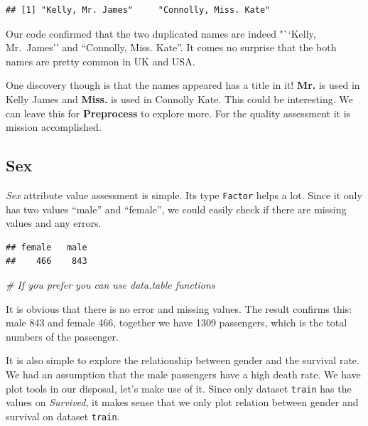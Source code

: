 \documentclass[
]{book}
\newenvironment{Shaded}{\begin{snugshade}}{\end{snugshade}}
\newcommand{\CommentTok}[1]{\textcolor[rgb]{0.56,0.35,0.01}{\textit{#1}}}
\newcommand{\KeywordTok}[1]{\textcolor[rgb]{0.13,0.29,0.53}{\textbf{#1}}}
\newcommand{\NormalTok}[1]{#1}
\newcommand{\OperatorTok}[1]{\textcolor[rgb]{0.81,0.36,0.00}{\textbf{#1}}}
\begin{document}
\begin{verbatim}
## [1] "Kelly, Mr. James"     "Connolly, Miss. Kate"
\end{verbatim}

Our code confirmed that the two duplicated names are indeed "``Kelly, Mr.~James'' and ``Connolly, Miss. Kate''. It comes no surprise that the both names are pretty common in UK and USA.

One discovery though is that the names appeared has a title in it! \textbf{Mr.} is used in Kelly James and \textbf{Miss.} is used in Connolly Kate. This could be interesting. We can leave this for \textbf{Preprocess} to explore more. For the quality assessment it is mission accomplished.

\hypertarget{sex}{%
\subsection{Sex}\label{sex}}

\emph{Sex} attribute value assessment is simple. Its type \texttt{Factor} helps a lot. Since it only has two values ``male'' and ``female'', we could easily check if there are missing values and any errors.

\begin{Shaded}
\end{Shaded}

\begin{verbatim}
## female   male 
##    466    843
\end{verbatim}

\begin{Shaded}
\begin{Highlighting}[]
\CommentTok{# If you prefer you can use data.table functions}
\end{Highlighting}
\end{Shaded}

It is obvious that there is no error and missing values. The result confirms this: male 843 and female 466, together we have 1309 passengers, which is the total numbers of the passenger.

It is also simple to explore the relationship between gender and the survival rate. We had an assumption that the male passengers have a high death rate. We have plot tools in our disposal, let's make use of it. Since only dataset \texttt{train} has the values on \emph{Survived}, it makes sense that we only plot relation between gender and survival on dataset \texttt{train}.
\end{document}
